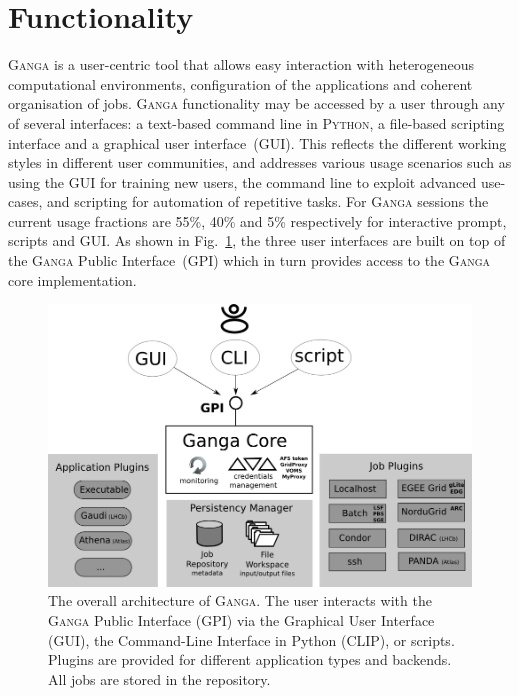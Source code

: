 \documentclass{elsart}
\def\ganga {\textsc{Ganga}\xspace}
\def\python {\textsc{Python}\xspace}
\def\GPI{GPI\xspace}
\begin{document}
\section{Functionality}
\label{sec:functionality}
\ganga is a user-centric tool that allows easy interaction with heterogeneous
computational environments, configuration of the applications and coherent
organisation of jobs. \ganga functionality may be accessed by a user through
any of several interfaces: a text-based command line in \python, a file-based
scripting interface and a graphical user interface~(GUI). This reflects the different
working styles in different user communities, and addresses various usage
scenarios such as using the GUI for training new users, the command line to
exploit advanced use-cases, and scripting for automation of repetitive tasks.
For \ganga sessions the current usage fractions are 55\%, 40\% and 5\%
respectively for interactive prompt, scripts and GUI. As shown in
Fig.~\ref{fig:GPI_architecture}, the three user interfaces are built on top of
the \ganga Public Interface~(\GPI) which in turn provides access to the \ganga
core implementation.
\begin{figure}[htbp]
  \centering
  \includegraphics[width=14cm]{ganga-architecture.png}
  \caption{The overall architecture of \ganga. The user interacts with the
    \ganga Public Interface (GPI) via the Graphical User Interface (GUI), the
    Command-Line Interface in Python (CLIP), or
    scripts. Plugins are provided for different application types and
    backends. All jobs are stored in the
    repository.}
  \label{fig:GPI_architecture}
\end{figure}
\end{document}
